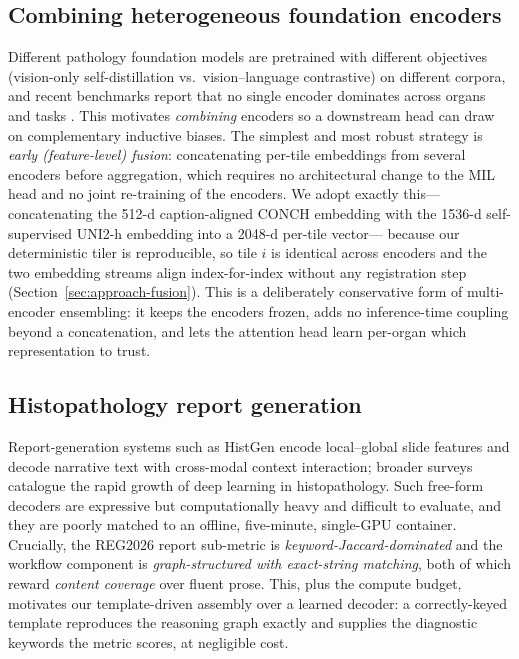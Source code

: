 \documentclass[11pt,a4paper]{article}
\begin{document}
\subsection{Combining heterogeneous foundation encoders}
\label{sec:related-fusion}
Different pathology foundation models are pretrained with different objectives (vision-only
self-distillation vs.\ vision--language contrastive) on different corpora, and recent benchmarks
report that no single encoder dominates across organs and tasks
\cite{chen2024uni,lu2024conch,vorontsov2024virchow}. This motivates \emph{combining} encoders so a
downstream head can draw on complementary inductive biases. The simplest and most robust strategy
is \emph{early (feature-level) fusion}: concatenating per-tile embeddings from several encoders
before aggregation, which requires no architectural change to the MIL head and no joint
re-training of the encoders. We adopt exactly this---concatenating the 512-d caption-aligned
CONCH embedding with the 1536-d self-supervised UNI2-h embedding into a 2048-d per-tile vector---
because our deterministic tiler is reproducible, so tile $i$ is identical across encoders and the
two embedding streams align index-for-index without any registration step
(Section~\ref{sec:approach-fusion}). This is a deliberately conservative form of multi-encoder
ensembling: it keeps the encoders frozen, adds no inference-time coupling beyond a concatenation,
and lets the attention head learn per-organ which representation to trust.

\subsection{Histopathology report generation}
Report-generation systems such as HistGen \cite{tu2024histgen} encode local--global slide
features and decode narrative text with cross-modal context interaction; broader surveys
\cite{srinidhi2021deep} catalogue the rapid growth of deep learning in histopathology. Such
free-form decoders are expressive but computationally heavy and difficult to evaluate, and they
are poorly matched to an offline, five-minute, single-GPU container. Crucially, the REG2026
report sub-metric is \emph{keyword-Jaccard-dominated} and the workflow component is
\emph{graph-structured with exact-string matching}, both of which reward \emph{content coverage}
over fluent prose. This, plus the compute budget, motivates our template-driven assembly over a
learned decoder: a correctly-keyed template reproduces the reasoning graph exactly and supplies
the diagnostic keywords the metric scores, at negligible cost.
\end{document}

